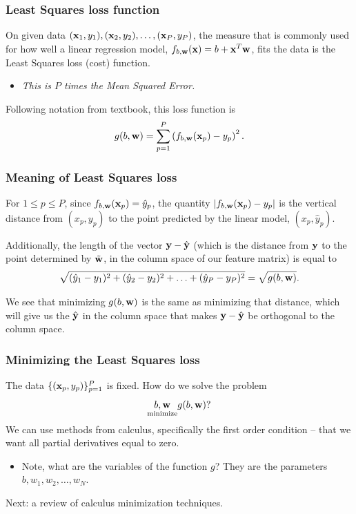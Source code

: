 \documentclass{beamer}
\theoremstyle{example}
\begin{document}
\begin{frame}
    \frametitle{Least Squares loss function}
    On given data $({\bf x}_1, y_1), ({\bf x}_2, y_2), \ldots, ({\bf x}_P, y_P)$, the measure that is commonly used for how well a linear regression model, $f_{b,{\bf w}}({\bf x}) = b + {\bf x}^T{\bf w}$, fits the data is the Least Squares loss (cost) function. 
    \vspace*{-8pt}
    \begin{itemize}
        \item \textit{This is $P$ times the Mean Squared Error.}
    \end{itemize}

    Following notation from textbook, this loss function is 
        \[g(b, {\bf w}) = \sum_{p=1}^P\left(f_{b,{\bf w}}({\bf x}_p) - y_p\right)^2.\]
    
\end{frame}

\begin{frame}
    \frametitle{Meaning of Least Squares loss}
    For $1\le p\le P$, since $f_{b,{\bf w}}({\bf x}_p) = \hat{y}_p$, the quantity $|f_{b,{\bf w}}({\bf x}_p) - y_p|$ is the vertical distance from $(x_p, y_p)$ to the point predicted by the linear model, $(x_p, \hat{y}_p)$. 

    Additionally, the length of the vector ${\bf y} - \hat{\bf y}$ (which is the distance from ${\bf y}$ to the point determined by $\tilde{\bf w}$, in the column space of our feature matrix) is equal to 
        \[\sqrt{(\hat{y}_1 - y_1)^2 + (\hat{y}_2 - y_2)^2 + \ldots + (\hat{y}_P - y_P)^2} = \sqrt{g(b, {\bf w})}.\]

    We see that minimizing $g(b, {\bf w})$ is the same as minimizing that distance, which will give us the $\hat{\bf y}$ in the column space that makes ${\bf y} - \hat{\bf y}$ be orthogonal to the column space.
\end{frame}

\begin{frame}
    \frametitle{Minimizing the Least Squares loss}
    The data $\{({\bf x}_p, y_p)\}_{p=1}^P$ is fixed. How do we solve the problem 
                \[\underset{\text{minimize}}{b,{\bf w}} g(b, {\bf w})?\]
    We can use methods from calculus, specifically the first order condition {--} that we want all partial derivatives equal to zero. 
    \begin{itemize}
        \item Note, what are the variables of the function $g$?  They are the parameters $b,w_1,w_2,\ldots,w_N$.
    \end{itemize}
    \vfill
    \pause
    Next: a review of calculus minimization techniques.
\end{frame}
\end{document}
